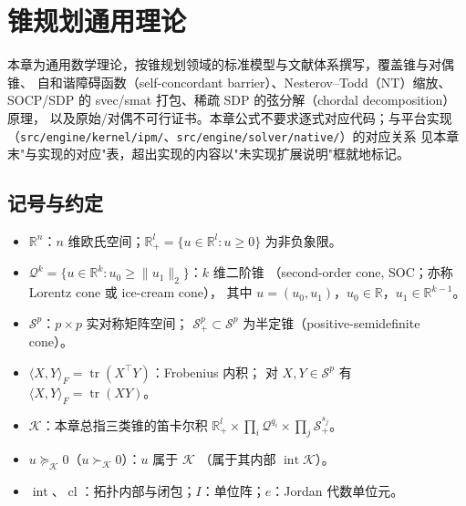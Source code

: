
\section{锥规划通用理论}

\begin{theorynote}
本章为通用数学理论，按锥规划领域的标准模型与文献体系撰写，覆盖锥与对偶锥、
自和谐障碍函数（self-concordant barrier）、Nesterov--Todd（NT）缩放、
SOCP/SDP 的 svec/smat 打包、稀疏 SDP 的弦分解（chordal decomposition）原理，
以及原始/对偶不可行证书。本章公式不要求逐式对应代码；与平台实现
（\texttt{src/engine/kernel/ipm/}、\texttt{src/engine/solver/native/}）的对应关系
见本章末"与实现的对应"表，超出实现的内容以"未实现扩展说明"框就地标记。
\end{theorynote}

\subsection{记号与约定}

\begin{itemize}
  \item $\mathbb{R}^n$：$n$ 维欧氏空间；$\mathbb{R}^l_+ = \{u \in \mathbb{R}^l : u \ge 0\}$ 为非负象限。
  \item $\mathcal{Q}^k = \{u \in \mathbb{R}^k : u_0 \ge \|u_1\|_2\}$：$k$ 维二阶锥
        （second-order cone, SOC；亦称 Lorentz cone 或 ice-cream cone），
        其中 $u = (u_0, u_1)$，$u_0 \in \mathbb{R}$，$u_1 \in \mathbb{R}^{k-1}$。
  \item $\mathcal{S}^p$：$p \times p$ 实对称矩阵空间；
        $\mathcal{S}^p_+ \subset \mathcal{S}^p$ 为半定锥（positive-semidefinite cone）。
  \item $\langle X, Y \rangle_F = \operatorname{tr}(X^\top Y)$：Frobenius 内积；
        对 $X, Y \in \mathcal{S}^p$ 有 $\langle X, Y \rangle_F = \operatorname{tr}(XY)$。
  \item $\mathcal{K}$：本章总指三类锥的笛卡尔积
        $\mathbb{R}^l_+ \times \prod_i \mathcal{Q}^{q_i} \times \prod_j \mathcal{S}^{s_j}_+$。
  \item $u \succeq_{\mathcal{K}} 0$（$u \succ_{\mathcal{K}} 0$）：$u$ 属于 $\mathcal{K}$
        （属于其内部 $\operatorname{int}\mathcal{K}$）。
  \item $\operatorname{int}$、$\operatorname{cl}$：拓扑内部与闭包；$I$：单位阵；$e$：Jordan 代数单位元。
\end{itemize}

